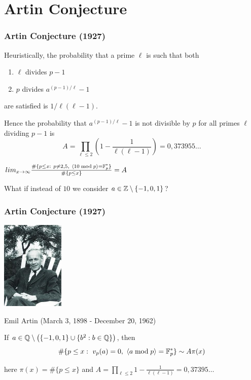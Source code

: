 \documentclass[10pt,handout]{beamer} %
\begin{document}
\section{Artin Conjecture}
\begin{frame}
\frametitle{Artin Conjecture (1927)}
\begin{Note} Heuristically, the probability that a prime $\ell$ is such that  both 
\begin{enumerate}
\item $\ell$ divides $p-1$
\item $p$ divides $a^{(p-1)/\ell}-1$
\end{enumerate}
are satisfied is $1/\ell(\ell-1)$.\pause

Hence the probability that $a^{(p-1)/\ell}-1$ is not divisible by $p$ for all primes $\ell$ dividing $p-1$ is
$$A=\prod_{\ell\le2}\left(1-\frac1{\ell(\ell-1)}\right)=0,373955\ldots$$
\end{Note}\pause

\begin{definition} %
\end{definition}\pause

\begin{conj}%
\centerline{$lim_{x\rightarrow\infty}\frac{\#\{p\le x:\ p\ne2,5,\  \langle 10\bmod p\rangle=\F_p^*\}}{\#\{p\le x\}}= A$}
\end{conj}\pause

What if instead of $10$ we consider $a\in\mathbb Z\setminus\{-1,0,1\}$?
\end{frame}

\begin{frame}
\frametitle{Artin Conjecture (1927)}

\centerline{\includegraphics[width=3cm]{images/EmilArtin.jpg}}

\centerline{Emil Artin (March 3, 1898 - December 20, 1962)}
\pause


\begin{conj} If $a\in\mathbb Q\setminus\left(\{-1,0,1\}\cup\{b^2: b\in\mathbb Q\}\right)$, then
$$\#\{p\le x:\ v_p(a)=0,\  \langle a\bmod p\rangle=\F_p^*\}\sim A\pi(x)$$
\end{conj}\pause

here $\pi(x)=\#\{p\le x\}$ and $A=\displaystyle{\prod_{\ell\le2}}1-\frac1{\ell(\ell-1)}=0,37395\ldots$
\end{frame}
\end{document}
